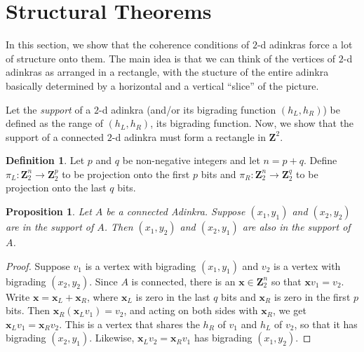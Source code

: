 \documentclass[12pt,twoside,singlespace]{article}
\numberwithin{equation}{section}
\newtheorem{prop}[equation]{Proposition}
\theoremstyle{definition}
\newtheorem{definition}[equation]{Definition}
\newcommand{\ZZ}{\mathbf{Z}}
\renewcommand{\vec}[1]{\mathbf{#1}}
\begin{document}
\section{Structural Theorems}
\label{sec:structural}

In this section, we show that the coherence conditions of $2$-d adinkras force a lot of structure onto them. The main idea is that we can think of the vertices of $2$-d adinkras as arranged in a rectangle, with the stucture of the entire adinkra basically determined by a horizontal and a vertical ``slice'' of the picture.

Let the \emph{support} of a $2$-d adinkra (and/or its bigrading function $(h_L,h_R)$) be defined as the range of $(h_L,h_R)$, its bigrading function. Now, we show that the support of a connected $2$-d adinkra must form a rectangle in $\ZZ^2$.


\begin{definition}
Let $p$ and $q$ be non-negative integers and let $n=p+q$.  Define $\pi_L:\ZZ_2^n\to\ZZ_2^p$ to be projection onto the first $p$ bits and $\pi_R:\ZZ_2^n\to\ZZ_2^q$ to be projection onto the last $q$ bits.
\end{definition}

\begin{prop}
\label{prop:rectangle-completion}
Let $A$ be a connected Adinkra.  Suppose $(x_1,y_1)$ and $(x_2,y_2)$ are in the support of $A$.  Then $(x_1,y_2)$ and $(x_2,y_1)$ are also in the support of $A$.
\end{prop}
\begin{proof}
Suppose $v_1$ is a vertex with bigrading $(x_1,y_1)$ and $v_2$ is a vertex with bigrading $(x_2,y_2)$.  Since $A$ is connected, there is an $\vec{x}\in\ZZ_2^n$ so that $\vec{x}v_1=v_2$.  Write $\vec{x}=\vec{x}_L+\vec{x}_R$, where $\vec{x}_L$ is zero in the last $q$ bits and $\vec{x}_R$ is zero in the first $p$ bits.  Then $\vec{x}_R(\vec{x}_Lv_1)=v_2$, and acting on both sides with $\vec{x}_R$, we get $\vec{x}_Lv_1=\vec{x}_Rv_2$.  This is a vertex that shares the $h_R$ of $v_1$ and $h_L$ of $v_2$, so that it has bigrading $(x_2,y_1)$.  Likewise, $\vec{x}_L v_2=\vec{x}_R v_1$ has bigrading $(x_1,y_2)$.
\end{proof}
\end{document}
